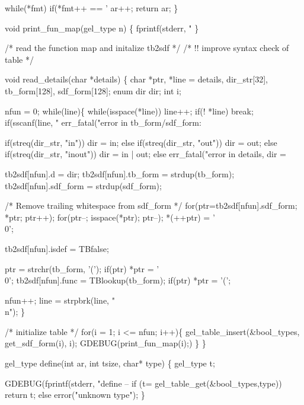   while(*fmt)
    if(*fmt++ == '%
      ar++;
  return ar;
\}

void print_fun_map(gel_type n)
\{
  fprintf(stderr, "%
\}

/* read the function map and initalize tb2sdf */
/* !! improve syntax check of table */

void read_details(char *details)
\{
  char *ptr, *line = details, dir_str[32], tb_form[128], sdf_form[128];
  enum dir dir;
  int i;

  nfun = 0;
  while(line)\{ 
    while(isspace(*line))
      line++;
    if(! *line)
      break;
    if(sscanf(line, "%
      err_fatal("error in tb_form/sdf_form: %

    if(streq(dir_str, "in"))
      dir = in;
    else if(streq(dir_str, "out"))
      dir = out;
    else if(streq(dir_str, "inout"))
      dir = in | out;
    else
     err_fatal("error in details, dir = %
    
    tb2sdf[nfun].d = dir;
    tb2sdf[nfun].tb_form = strdup(tb_form);
    tb2sdf[nfun].sdf_form = strdup(sdf_form);

    /* Remove trailing whitespace from sdf_form */
    for(ptr=tb2sdf[nfun].sdf_form; *ptr; ptr++);
    for(ptr--; isspace(*ptr); ptr--);
    *(++ptr) = '\\0';

    tb2sdf[nfun].isdef = TBfalse;

    ptr = strchr(tb_form, '(');
    if(ptr)
      *ptr = '\\0';
    tb2sdf[nfun].func = TBlookup(tb_form);
    if(ptr)
      *ptr = '(';

    nfun++;
    line = strpbrk(line, "\\n");    
  \}

  /* initialize table */
  for(i = 1; i <= nfun; i++)\{
    gel_table_insert(&bool_types, get_sdf_form(i), i);
    GDEBUG(print_fun_map(i);)
  \}
\}

gel_type define(int ar, int tsize, char* type)
\{  gel_type t;

   
   GDEBUG(fprintf(stderr, "define -- %
   if (t= gel_table_get(&bool_types,type)) return t;
   else error("unknown type");
\}

